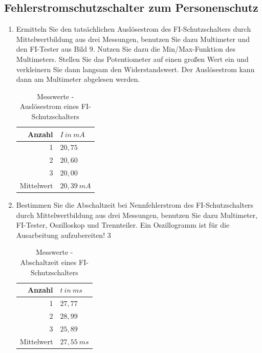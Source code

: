	\subsection{Fehlerstromschutzschalter zum Personenschutz}
		\begin{enumerate}[label=\alph*)]
			\item Ermitteln Sie den tatsächlichen Auslösestrom des FI-Schutzschalters durch Mittelwertbildung aus drei Messungen, benutzen Sie dazu Multimeter und den FI-Tester aus Bild 9. Nutzen Sie dazu die Min/Max-Funktion des Multimeters. Stellen Sie das Potentiometer auf einen großen Wert ein und verkleinern Sie dann langsam den Widerstandswert. Der Auslösestrom kann dann am Multimeter abgelesen werden.
			\begin{center}
				\begin{table}[h]
					\begin{tabular}{r l}
						\hline
						Anzahl & \( I\ in\ mA \) \\
						\hline
						1 & \( 20,75 \) \\
						2 & \( 20,60 \) \\
						3 & \( 20,00 \) \\
						\hline
						Mittelwert & \( 20,39\ mA \) \\
						\hline
					\end{tabular}
					\caption{Messwerte - Auslösestrom eines FI-Schutzschalters}
				\end{table}
			\end{center}
			
			
			\item Bestimmen Sie die Abschaltzeit bei Nennfehlerstrom des FI-Schutzschalters durch Mittelwertbildung aus drei Messungen, benutzen Sie dazu Multimeter, FI-Tester, Oszilloskop und Trennteiler. Ein Oszillogramm ist für die Ausarbeitung aufzubereiten! 
			3
			\begin{center}
				\begin{table}[h]
					\begin{tabular}{r l}
						\hline
						Anzahl & \( t\ in\ ms \) \\
						\hline
						1 & \( 27,77 \) \\
						2 & \( 28,99 \) \\
						3 & \( 25,89 \) \\
						\hline
						Mittelwert & \( 27,55\ ms \) \\
						\hline
					\end{tabular}
					\caption{Messwerte - Abschaltzeit eines FI-Schutzschalters}
				\end{table}
			\end{center}
			
		\end{enumerate}
 	
